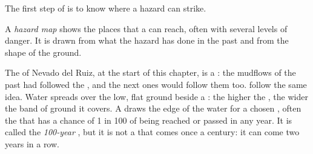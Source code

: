 The first step of  is to know where a hazard can strike.

\begin{definition}\label{def:g9:natural-risks:hazard-map}
A \emph{hazard map} shows the places that a  can reach, often with several levels of danger. It is drawn from
what the hazard has done in the past and from the shape of the ground.
\end{definition}

The  of Nevado del Ruiz, at the start of this chapter, is a
: the mudflows of the past had followed the , and the
next ones would follow them too.   follow the same idea. Water
spreads over the low, flat ground beside a : the higher the ,
the wider the band of ground it covers. A   draws the edge of the
water for a chosen , often the  that has a chance of 1 in 100
of being reached or passed in any year. It is called the
\emph{100-year }, but it is not a  that comes once a century:
it can come two years in a row.

